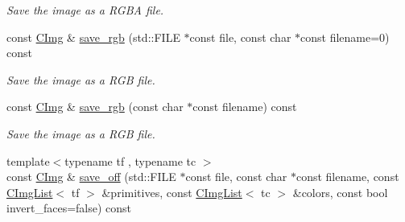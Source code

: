 \begin{DoxyCompactItemize}
\begin{DoxyCompactList}\small\item\em Save the image as a RGBA file. \item\end{DoxyCompactList}\item 
\hypertarget{structcimg__library_1_1_c_img_a05f2988b7be539403f308b06389f2767}{
const \hyperlink{structcimg__library_1_1_c_img}{CImg} \& \hyperlink{structcimg__library_1_1_c_img_a05f2988b7be539403f308b06389f2767}{save\_\-rgb} (std::FILE $\ast$const file, const char $\ast$const filename=0) const }
\label{structcimg__library_1_1_c_img_a05f2988b7be539403f308b06389f2767}

\begin{DoxyCompactList}\small\item\em Save the image as a RGB file. \item\end{DoxyCompactList}\item 
\hypertarget{structcimg__library_1_1_c_img_a871402e0f41b33b8e560354d858f03bd}{
const \hyperlink{structcimg__library_1_1_c_img}{CImg} \& \hyperlink{structcimg__library_1_1_c_img_a871402e0f41b33b8e560354d858f03bd}{save\_\-rgb} (const char $\ast$const filename) const }
\label{structcimg__library_1_1_c_img_a871402e0f41b33b8e560354d858f03bd}

\begin{DoxyCompactList}\small\item\em Save the image as a RGB file. \item\end{DoxyCompactList}\item 
\hypertarget{structcimg__library_1_1_c_img_a2e6c95bf834f29683d75b0e168df4c42}{
{\footnotesize template$<$typename tf , typename tc $>$ }\\const \hyperlink{structcimg__library_1_1_c_img}{CImg} \& \hyperlink{structcimg__library_1_1_c_img_a2e6c95bf834f29683d75b0e168df4c42}{save\_\-off} (std::FILE $\ast$const file, const char $\ast$const filename, const \hyperlink{structcimg__library_1_1_c_img_list}{CImgList}$<$ tf $>$ \&primitives, const \hyperlink{structcimg__library_1_1_c_img_list}{CImgList}$<$ tc $>$ \&colors, const bool invert\_\-faces=false) const }
\label{structcimg__library_1_1_c_img_a2e6c95bf834f29683d75b0e168df4c42}


\end{DoxyCompactItemize}
